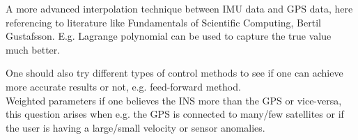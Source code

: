 A more advanced interpolation technique between IMU data and GPS data, here referencing to literature like Fundamentals of Scientific Computing, Bertil Gustafsson. E.g. Lagrange polynomial can be used to capture the true value much better.\newline


One should also try different types of control methods to see if one can achieve more accurate results or not, e.g. feed-forward method.\\
Weighted parameters if one believes the INS more than the GPS or vice-versa, this question arises when e.g. the GPS is connected to many/few satellites or if the user is having a large/small velocity or sensor anomalies.
